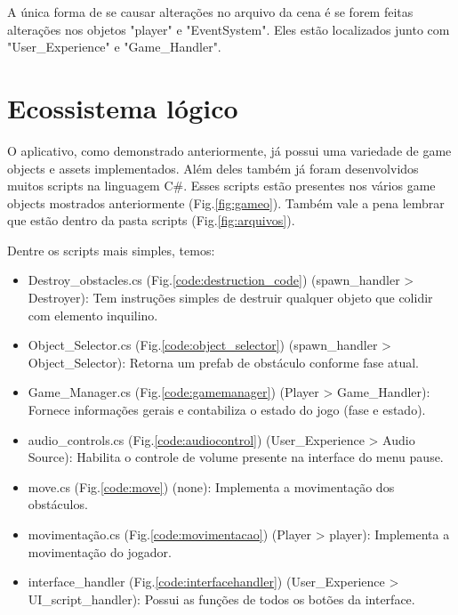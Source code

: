     A única forma de se causar alterações no arquivo da cena é se forem feitas alterações nos objetos "player" e "EventSystem".
    Eles estão localizados junto com "User\_Experience" e "Game\_Handler".




    \section{Ecossistema lógico}

    O aplicativo, como demonstrado anteriormente, já possui uma variedade de game objects e assets implementados.
    Além deles também já foram desenvolvidos muitos scripts na linguagem C\#.
    Esses scripts estão presentes nos vários game objects mostrados anteriormente (Fig.\ref{fig:gameo}). 
    Também vale a pena lembrar que estão dentro da pasta scripts (Fig.\ref{fig:arquivos}).

    Dentre os scripts mais simples, temos:

    \begin{itemize}

        \item Destroy\_obstacles.cs (Fig.\ref{code:destruction_code}) (spawn\_handler > Destroyer): Tem instruções simples de destruir qualquer objeto que colidir com elemento inquilino.

        \item Object\_Selector.cs (Fig.\ref{code:object_selector}) (spawn\_handler > Object\_Selector): Retorna um prefab de obstáculo conforme fase atual.

        \item Game\_Manager.cs (Fig.\ref{code:gamemanager}) (Player > Game\_Handler): Fornece informações gerais e contabiliza o estado do jogo (fase e estado).

        \item audio\_controls.cs (Fig.\ref{code:audiocontrol}) (User\_Experience > Audio Source): Habilita o controle de volume presente na interface do menu pause.
        
        \item move.cs (Fig.\ref{code:move}) (none): Implementa a movimentação dos obstáculos.

        \item movimentação.cs (Fig.\ref{code:movimentacao}) (Player > player): Implementa a movimentação do jogador.

        \item interface\_handler (Fig.\ref{code:interfacehandler}) (User\_Experience > UI\_script\_handler): Possui as funções de todos os botões da interface.

    \end{itemize}

